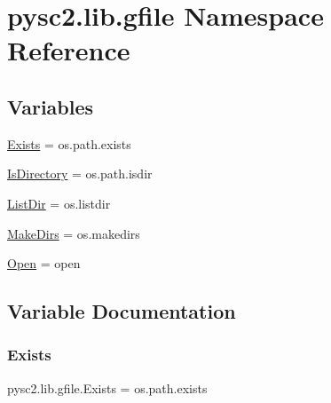 \hypertarget{namespacepysc2_1_1lib_1_1gfile}{}\section{pysc2.\+lib.\+gfile Namespace Reference}
\label{namespacepysc2_1_1lib_1_1gfile}
\subsection*{Variables}
\begin{DoxyCompactItemize}
\item 
\mbox{\hyperlink{namespacepysc2_1_1lib_1_1gfile_ac87c43a35bfded2ce15d7c312d037e02}{Exists}} = os.\+path.\+exists
\item 
\mbox{\hyperlink{namespacepysc2_1_1lib_1_1gfile_ab39639637b908772183d33dff2c89da2}{Is\+Directory}} = os.\+path.\+isdir
\item 
\mbox{\hyperlink{namespacepysc2_1_1lib_1_1gfile_ad9c302db7f255acdfd8787281e843c49}{List\+Dir}} = os.\+listdir
\item 
\mbox{\hyperlink{namespacepysc2_1_1lib_1_1gfile_a4cbb5541d2a02394c847f103936bbca0}{Make\+Dirs}} = os.\+makedirs
\item 
\mbox{\hyperlink{namespacepysc2_1_1lib_1_1gfile_ab1fe784a279c20f90486ceae4cef0f8c}{Open}} = open
\end{DoxyCompactItemize}


\subsection{Variable Documentation}
\mbox{\label{namespacepysc2_1_1lib_1_1gfile_ac87c43a35bfded2ce15d7c312d037e02}} 
\subsubsection{\texorpdfstring{Exists}{Exists}}
{\footnotesize\ttfamily pysc2.\+lib.\+gfile.\+Exists = os.\+path.\+exists}

\mbox{\label{namespacepysc2_1_1lib_1_1gfile_ab39639637b908772183d33dff2c89da2}} 
